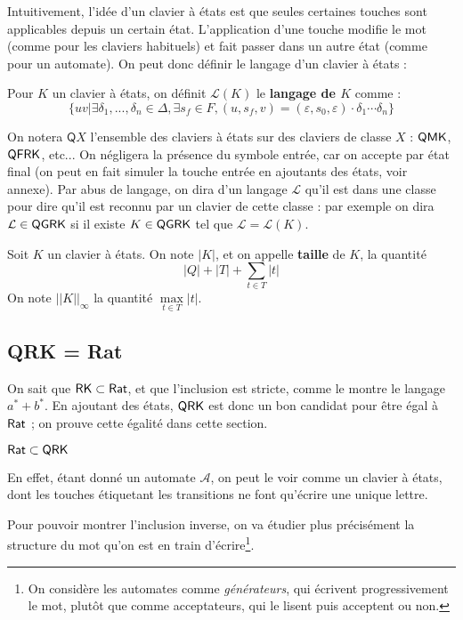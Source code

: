 \documentclass[12pt, a4paper]{article}
\renewcommand{\L}{\mathcal{L}}
\newcommand{\A}{\mathcal{A}}
\newcommand{\Kinf}{||K||_{\infty}}
\begin{document}
    Intuitivement, l'idée d'un clavier à états est que seules certaines touches sont applicables depuis un certain état. L'application d'une touche modifie le mot (comme pour les claviers habituels)
    et fait passer dans un autre état (comme pour un automate).
    On peut donc définir le langage d'un clavier à états :
    \begin{langageclavierQ}
        Pour $K$ un clavier à états, on définit $\L(K)$ le \textbf{langage de $K$} comme :
        \[ \{uv | \exists\delta_1,...,\delta_n \in \Delta, \exists s_f \in F, (u,s_f,v) = (\varepsilon,s_0,\varepsilon)\cdot\delta_1\cdots\delta_n \}\]
    \end{langageclavierQ}
    On notera $\mathsf{Q}X$ l'ensemble des claviers à états sur des claviers de classe $X$ : $\mathsf{QMK}$, $\mathsf{QFRK}$, etc... 
    On négligera la présence du symbole entrée, car on accepte par état final (on peut en fait simuler la touche entrée en ajoutants des états, voir annexe).
    Par abus de langage, on dira d'un langage $\L$ qu'il est dans une classe pour dire qu'il est reconnu par un clavier de cette classe : 
    par exemple on dira $\L \in \QGRK$ si il existe $K \in \mathsf{QGRK}$ tel que $\L = \L(K)$.
    \begin{tailleclavierQ}
        Soit $K$ un clavier à états. On note $|K|$, et on appelle \textbf{taille} de $K$, la quantité 
        \[ |Q| + |T| + \sum_{t \in T} |t|\]
        On note $\Kinf$ la quantité $\max\limits_{t \in T} |t|$.
    \end{tailleclavierQ}

    \subsection{QRK = Rat}
    On sait que \autocite[théorèmes~101/102]{bible} $\mathsf{RK} \subset \mathsf{Rat}$, et que l'inclusion est stricte, comme le montre le langage $a^* + b^*$. En ajoutant des états,
    $\mathsf{QRK}$ est donc un bon candidat pour être égal à $\mathsf{Rat}$ ; on prouve cette égalité dans cette section.
    
    \begin{RatdansQRK}
        $\mathsf{Rat} \subset \mathsf{QRK}$
    \end{RatdansQRK}
    En effet, étant donné un automate $\A$, on peut le voir comme un clavier à états, dont les touches étiquetant les transitions 
    ne font qu'écrire une unique lettre.
    


    Pour pouvoir montrer l'inclusion inverse, on va étudier plus précisément la structure du mot qu'on est en train d'écrire\footnote{On considère les automates comme \emph{générateurs}, qui écrivent progressivement le mot, plutôt que comme acceptateurs, qui le lisent puis acceptent ou non.}.
    
\end{document}
